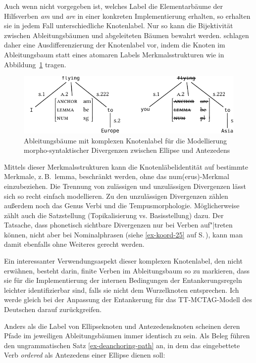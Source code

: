 Auch wenn nicht vorgegeben ist, welches Label die Elementarbäume der Hilfsverben {\it am} und {\it are} in einer konkreten Implementierung erhalten, so erhalten sie in jedem Fall unterschiedliche Knotenlabel. Nur so kann die Bijektivität zwischen Ableitungsbäumen und abgeleiteten Bäumen bewahrt werden. 
\cite{Lichte:Kallmeyer:10} schlagen daher eine Ausdifferenzierung der Knotenlabel vor, indem die Knoten im Ableitungsbaum statt eines atomaren Labels Merkmalsstrukturen wie in Abbildung~\ref{fig-deanchoring-9} tragen. 
\begin{figure}[t]
\centering
\includegraphics{graphics/abb822.pdf}
\caption{\label{fig-deanchoring-9}Ableitungsbäume mit komplexen Knotenlabel für die Modellierung morpho-syntaktischer Divergenzen zwischen Ellipse und Antezedens \citep[(7)]{Lichte:Kallmeyer:10}}
\end{figure}
Mittels dieser Merkmalsstrukturen kann die Knotenläbelidentität auf bestimmte Merkmale, z.\,B.\ {\sc lemma}, beschränkt werden, ohne das {\sc num(erus)}-Merkmal einzubeziehen. Die Trennung von zulässigen und unzulässigen Divergenzen lässt sich so recht einfach modellieren. Zu den unzulässigen Divergenzen zählen \cite{Lichte:Kallmeyer:10} au\ss erdem noch das Genus Verbi und die Tempusmorphologie. Möglicherweise zählt auch die Satzstellung (Topikalisierung vs. Basisstellung) dazu. Der Tatsache, dass phonetisch sichtbare Divergenzen nur bei Verben auf"|treten können, nicht aber bei Nominalphrasen (siehe \ref{ex-koord-25} auf S.\,\pageref{ex-koord-25}), kann man damit ebenfalls ohne Weiteres gerecht werden.

Ein interessanter Verwendungsaspekt dieser komplexen Knotenlabel, den \cite{Lichte:Kallmeyer:10} nicht erwähnen, besteht darin, finite Verben im Ableitungsbaum so zu markieren, dass sie für die Implementierung der internen Bedingungen der Entankerungsregeln leichter identifizierbar sind, falls sie nicht dem Wurzelknoten entsprechen. Ich werde gleich bei der Anpassung der Entankerung für das TT-MCTAG-Modell des Deutschen darauf zurückgreifen.

Anders als die Label von Ellipseknoten und Antezedensknoten scheinen deren Pfade im jeweiligen Ableitungsbäumen immer identisch zu sein. Als Beleg führen \cite{Lichte:Kallmeyer:10} den ungrammatischen Satz \ref{ex-deanchoring-path} an, in dem das eingebettete Verb {\it ordered} als Antezedens einer Ellipse dienen soll:  


